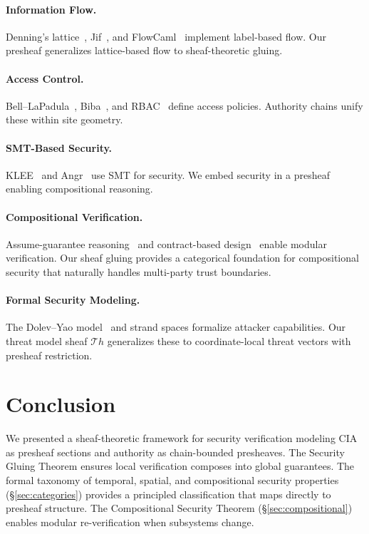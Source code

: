 \documentclass[11pt]{article}
\begin{document}
\paragraph{Information Flow.}
Denning's lattice~\cite{Denning1976}, Jif~\cite{Myers2006}, and
FlowCaml~\cite{Simonet2003} implement label-based flow.  Our presheaf
generalizes lattice-based flow to sheaf-theoretic gluing.

\paragraph{Access Control.}
Bell--LaPadula~\cite{BellLaPadula}, Biba~\cite{Biba1977}, and
RBAC~\cite{Sandhu1996} define access policies.  Authority chains
unify these within site geometry.

\paragraph{SMT-Based Security.}
KLEE~\cite{Cadar2008} and Angr~\cite{Shoshitaishvili2016} use SMT
for security.  We embed security in a presheaf enabling compositional
reasoning.

\paragraph{Compositional Verification.}
Assume-guarantee reasoning~\cite{Henzinger1998} and
contract-based design~\cite{Benveniste2012} enable modular
verification.  Our sheaf gluing provides a categorical foundation
for compositional security that naturally handles multi-party
trust boundaries.

\paragraph{Formal Security Modeling.}
The Dolev--Yao model~\cite{DolevYao1983} and strand spaces
\cite{ThayerHerzogGuttman1999} formalize attacker capabilities.
Our threat model sheaf $\mathcal{T}\!h$ generalizes these to
coordinate-local threat vectors with presheaf restriction.

\section{Conclusion}\label{sec:conclusion}

We presented a sheaf-theoretic framework for security verification
modeling CIA as presheaf sections and authority as chain-bounded
presheaves.  The Security Gluing Theorem ensures local verification
composes into global guarantees.  The formal taxonomy of temporal,
spatial, and compositional security properties
(\S\ref{sec:categories}) provides a principled classification that
maps directly to presheaf structure.  The Compositional Security
Theorem (\S\ref{sec:compositional}) enables modular re-verification
when subsystems change.
\end{document}
